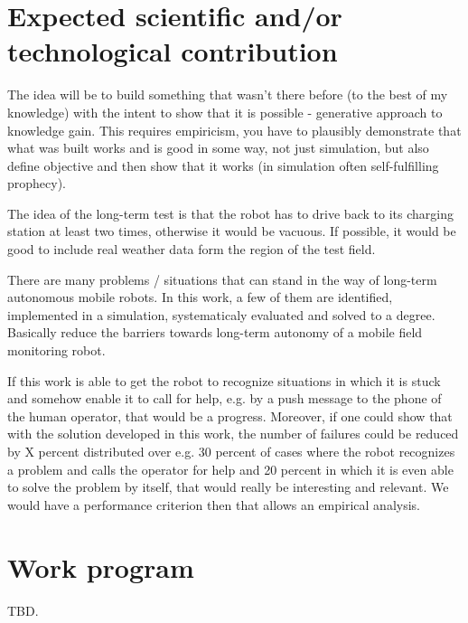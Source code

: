 \documentclass[german, master, expose, latin1]{base/thesis_KBS}
\begin{document}
\section{Expected scientific and/or technological contribution}

The idea will be to build something that wasn't there before (to the best of my knowledge) with the intent to show that it is possible - generative approach to knowledge gain.
This requires empiricism, you have to plausibly demonstrate that what was built works and is good in some way, not just simulation, but also define objective and then 
show that it works (in simulation often self-fulfilling prophecy).\newline

The idea of the long-term test is that the robot has to drive back to its charging station at least two times, otherwise it would be vacuous.
If possible, it would be good to include real weather data form the region of the test field.\newline

There are many problems / situations that can stand in the way of long-term autonomous mobile robots. In this work, a few of them are identified,
implemented in a simulation, systematicaly evaluated and solved to a degree. Basically reduce the barriers towards long-term autonomy of a mobile field
monitoring robot.\newline

If this work is able to get the robot to recognize situations in which it is stuck and somehow enable it to call for help, e.g. by a push message to
the phone of the human operator, that would be a progress. Moreover, if one could show that with the solution developed in this work, the number of failures
could be reduced by X percent distributed over e.g. 30 percent of cases where the robot recognizes a problem and calls the operator for help and 20 percent in which
it is even able to solve the problem by itself, that would really be interesting and relevant. We would have a performance criterion then that allows 
an empirical analysis.

\section{Work program}

TBD.


\end{document}

